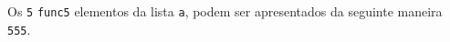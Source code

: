 \documentclass[12pt,varwidth=16cm,border=1pt]{standalone}
\begin{document}
Os \verb+5+ \verb+func5+ elementos da lista \verb+a+, podem ser apresentados da seguinte maneira \verb+555+.

\questiomfalse
\end{document}
